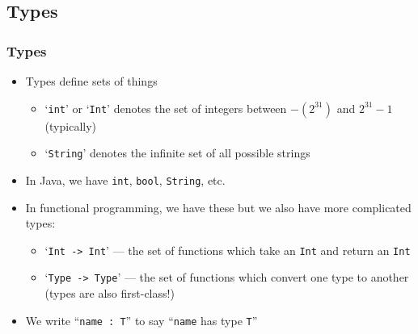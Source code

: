 \documentclass{beamer}
\begin{document}
  \subsection{Types}
  \begin{frame}
    \frametitle{Types}

    \begin{itemize}
      \item Types define sets of things
        \begin{itemize}
          \item `\texttt{int}' or `\texttt{Int}' denotes the set of integers
                between $-(2^{31})$ and $2^{31} - 1$ (typically)
          \item `\texttt{String}' denotes the infinite set of all possible strings
        \end{itemize}
      \item In Java, we have \texttt{int}, \texttt{bool}, \texttt{String}, etc.
      \item In functional programming, we have these but we also have more
            complicated types:
        \begin{itemize}
          \item `\texttt{Int -> Int}' --- the set of functions which take an
                \texttt{Int} and return an \texttt{Int}
          \item `\texttt{Type -> Type}' --- the set of functions which convert one
                type to another (types are also first-class!)
        \end{itemize}
      \item We write ``\texttt{name : T}'' to say ``\texttt{name} has type
            \texttt{T}''
    \end{itemize}

  \end{frame}
\end{document}
